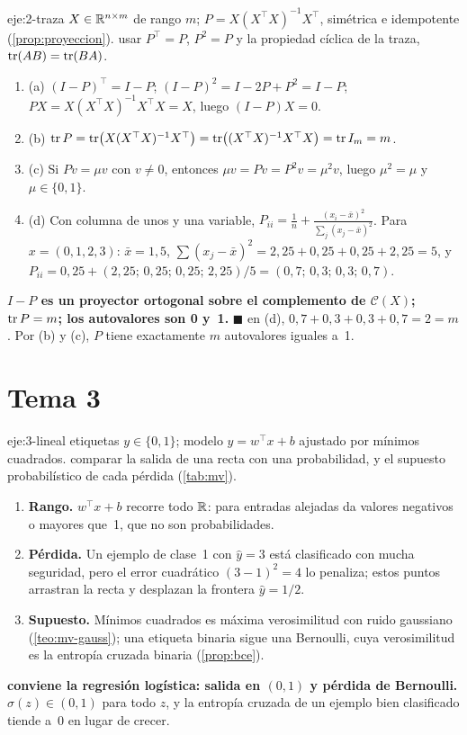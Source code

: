 \begin{solucion}{eje:2-traza}
\datos $X\in\mathbb{R}^{n\times m}$ de rango $m$; $P=X(X^{\top}X)^{-1}X^{\top}$, simétrica e idempotente (\cref{prop:proyeccion}).
\planteamiento usar $P^{\top}=P$, $P^{2}=P$ y la propiedad cíclica de la traza, $\operatorname{tr}(AB)=\operatorname{tr}(BA)$.
\pasos
\begin{enumerate}[label=\arabic*.]
  \item (a) $(I-P)^{\top}=I-P$; $(I-P)^{2}=I-2P+P^{2}=I-P$; $PX=X(X^{\top}X)^{-1}X^{\top}X=X$, luego $(I-P)X=0$.
  \item (b) $\operatorname{tr} P=\operatorname{tr}\bigl(X(X^{\top}X)^{-1}X^{\top}\bigr)=\operatorname{tr}\bigl((X^{\top}X)^{-1}X^{\top}X\bigr)=\operatorname{tr} I_m=m$.
  \item (c) Si $Pv=\mu v$ con $v\ne 0$, entonces $\mu v=Pv=P^{2}v=\mu^{2}v$, luego $\mu^{2}=\mu$ y $\mu\in\{0,1\}$.
  \item (d) Con columna de unos y una variable, $P_{ii}=\frac1n+\frac{(x_i-\bar x)^{2}}{\sum_j(x_j-\bar x)^{2}}$. Para $x=(0,1,2,3)$: $\bar x=1{,}5$, $\sum(x_j-\bar x)^{2}=2{,}25+0{,}25+0{,}25+2{,}25=5$, y $P_{ii}=0{,}25+(2{,}25;\,0{,}25;\,0{,}25;\,2{,}25)/5=(0{,}7;\,0{,}3;\,0{,}3;\,0{,}7)$.
\end{enumerate}
\resultado \textbf{$I-P$ es un proyector ortogonal sobre el complemento de $\mathcal{C}(X)$; $\operatorname{tr} P=m$; los autovalores son 0 y~1.} $\blacksquare$
\comprobacion en (d), $0{,}7+0{,}3+0{,}3+0{,}7=2=m$. Por (b) y (c), $P$ tiene exactamente $m$ autovalores iguales a~1.
\end{solucion}

\section{Tema 3}

\begin{solucion}{eje:3-lineal}
\datos etiquetas $y\in\{0,1\}$; modelo $\hat y=w^{\top}x+b$ ajustado por mínimos cuadrados.
\planteamiento comparar la salida de una recta con una probabilidad, y el supuesto probabilístico de cada pérdida (\cref{tab:mv}).
\pasos
\begin{enumerate}[label=\arabic*.]
  \item \textbf{Rango.} $w^{\top}x+b$ recorre todo $\mathbb{R}$: para entradas alejadas da valores negativos o mayores que~1, que no son probabilidades.
  \item \textbf{Pérdida.} Un ejemplo de clase~1 con $\hat y=3$ está clasificado con mucha seguridad, pero el error cuadrático $(3-1)^{2}=4$ lo penaliza; estos puntos arrastran la recta y desplazan la frontera $\hat y=1/2$.
  \item \textbf{Supuesto.} Mínimos cuadrados es máxima verosimilitud con ruido gaussiano (\cref{teo:mv-gauss}); una etiqueta binaria sigue una Bernoulli, cuya verosimilitud es la entropía cruzada binaria (\cref{prop:bce}).
\end{enumerate}
\resultado \textbf{conviene la regresión logística: salida en $(0,1)$ y pérdida de Bernoulli.}
\comprobacion $\sigma(z)\in(0,1)$ para todo $z$, y la entropía cruzada de un ejemplo bien clasificado tiende a~0 en lugar de crecer.
\end{solucion}

